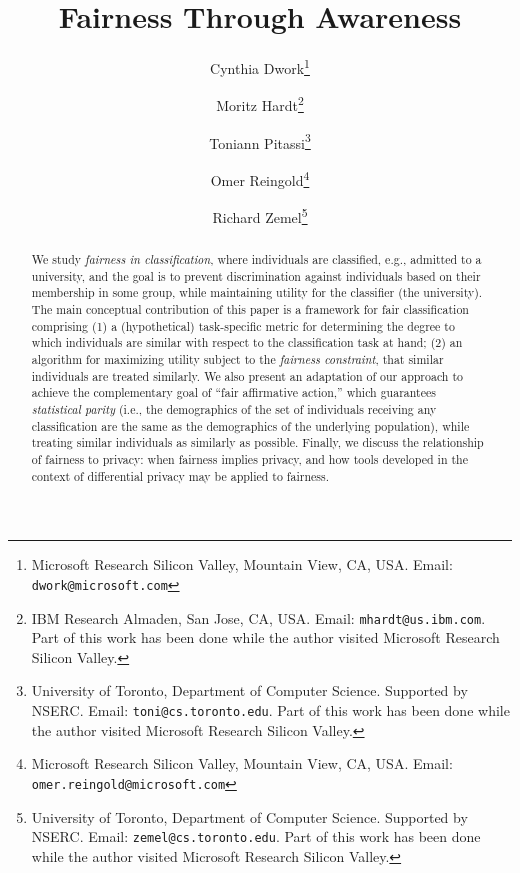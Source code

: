 \documentclass[letterpaper,11pt]{article}
\theoremstyle{definition}
\begin{document}
\title{Fairness Through Awareness}
\vspace{5mm}

\author{Cynthia Dwork\thanks{Microsoft Research Silicon Valley, Mountain View,
CA, USA. Email: {\tt dwork@microsoft.com}}
\and Moritz Hardt\thanks{
IBM Research Almaden, San Jose, CA, USA. Email: {\tt mhardt@us.ibm.com}. Part of
this work has been done while the author visited Microsoft Research Silicon
Valley.}
\and Toniann Pitassi\thanks{University of Toronto, Department of Computer Science.
Supported by NSERC. Email: {\tt toni@cs.toronto.edu}. Part of this work has been done while the author visited
Microsoft Research Silicon Valley.}
\and
Omer Reingold\thanks{Microsoft Research Silicon Valley, Mountain View,
CA, USA. Email: {\tt omer.reingold@microsoft.com}}
\and Richard Zemel\thanks{University of Toronto, Department of Computer Science.
Supported by NSERC.
Email: {\tt zemel@cs.toronto.edu}. Part of this work has been done while the author visited
Microsoft Research Silicon Valley.}}

\maketitle
\thispagestyle{empty}


\begin{abstract}
We study {\em fairness in classification}, where individuals are classified, 
e.g., admitted to a university, and the goal is to prevent
discrimination against individuals based on their membership in
some group, while maintaining utility for the classifier (the
university).  
The main conceptual contribution of this paper
    is a framework for fair classification comprising (1) a
    (hypothetical) task-specific metric for determining the degree to
    which individuals are similar with respect to the classification
    task at hand; (2) an algorithm for maximizing utility subject to
    the {\em fairness constraint}, that similar individuals are treated
    similarly.
We also present an adaptation of our approach to achieve the
complementary goal of ``fair affirmative action,'' which
    guarantees {\em statistical parity} (i.e., the demographics
of the set of individuals receiving any classification are the same as
the demographics of the underlying population), while treating similar
    individuals as similarly as possible.  
Finally, we discuss the relationship of fairness to privacy: when
fairness implies privacy, and how tools developed in
the context of differential privacy may be applied to fairness.
\end{abstract}
\end{document}
